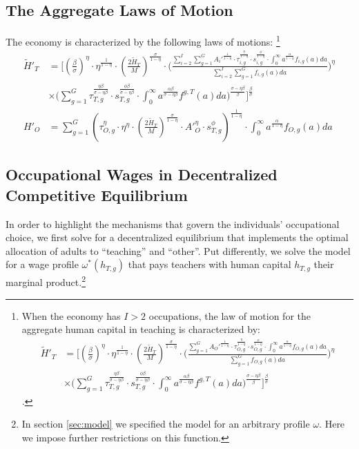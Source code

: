 \documentclass[onehalfspacing,11pt]{article}
\newtheorem{prp}{Proposition}
\begin{document}
\subsection{The Aggregate Laws of Motion}
The economy is characterized by the following laws of motions: \footnote{When the economy has $I>2$ occupations, the law of motion for the aggregate human capital in teaching is characterized by:
\begin{align*}
\widetilde{H}'_{T} & = \Bigg[ \left(\tfrac{\beta}{\sigma}\right)^\eta \cdot\eta^{\frac{1}{1-\eta}} \cdot \left(\tfrac{2\widetilde{H}_T}{M}\right)^{\frac{\sigma}{1-\eta}} \cdot \Bigg( \frac{\sum_{g=1}^G {A_O'}^\frac{1}{1-\eta}\cdot\tau_{O,g}^\frac{\eta}{1-\eta} \cdot s_{O,g}^\frac{\phi}{1-\eta}\cdot \int_0^\infty a^{\frac{\alpha}{1-\eta}} f_{O,g}(a)da}{\sum_{g=1}^G f_{O,g}(a)da} \Bigg)^\eta \nonumber\\
& \times \Bigg(\sum_{g=1}^G \tau_{T,g}^\frac{\eta\beta }{\sigma-\eta\beta } \cdot s_{T,g}^\frac{\phi\beta }{\sigma-\eta\beta } \cdot \int_0^\infty a^\frac{\alpha\beta}{\sigma-\eta\beta } f^{g,T}(a)da \Bigg)^\frac{\sigma-\eta\beta}{\beta} \Bigg]^\frac{\beta}{\sigma}
\end{align*}.
}
\begin{align}
\widetilde{H}'_{T} & = \Bigg[ \left(\tfrac{\beta}{\sigma}\right)^\eta \cdot\eta^{\frac{1}{1-\eta}} \cdot \left(\tfrac{2\widetilde{H}_T}{M}\right)^{\frac{\sigma}{1-\eta}} \cdot \Bigg( \frac{\sum_{i=2}^I \sum_{g=1}^G {A_i'}^\frac{1}{1-\eta}\cdot\tau_{i,g}^\frac{\eta}{1-\eta} \cdot s_{i,g}^\frac{\phi}{1-\eta}\cdot \int_0^\infty a^{\frac{\alpha}{1-\eta}} f_{i,g}(a)da}{\sum_{i=2}^I \sum_{g=1}^G f_{i,g}(a)da} \Bigg)^\eta \nonumber\\
& \times \Bigg(\sum_{g=1}^G \tau_{T,g}^\frac{\eta\beta }{\sigma-\eta\beta } \cdot s_{T,g}^\frac{\phi\beta }{\sigma-\eta\beta } \cdot \int_0^\infty a^\frac{\alpha\beta}{\sigma-\eta\beta } f^{g,T}(a)da \Bigg)^\frac{\sigma-\eta\beta}{\beta} \Bigg]^\frac{\beta}{\sigma}\\
{H}'_{O} & = \sum_{g=1}^G \left( \tau_{O,g}^\eta \cdot \eta^\eta \cdot \left(\tfrac{2\widetilde{H}_T}{M}\right)^\frac{\sigma}{1-\eta}\cdot {A'}_O^\eta \cdot s_{T,g}^\phi \right)^\frac{1}{1-\eta}\cdot \int_0^\infty a^{\frac{\alpha}{1-\eta}} f_{O,g}(a)da
\end{align}

\subsection{Occupational Wages in Decentralized Competitive Equilibrium}
In order to highlight the mechanisms that govern the individuals' occupational choice, we first solve for a decentralized equilibrium that implements the optimal allocation of adults to ``teaching'' and ``other''. Put differently, we solve the model for a wage profile $\omega^*(h_{T,g})$ that pays teachers with human capital $h_{T,g}$ their marginal product.\footnote{In section \ref{sec:model} we specified the model for an arbitrary profile $\omega$. Here we impose further restrictions on this function.}
\end{document}

